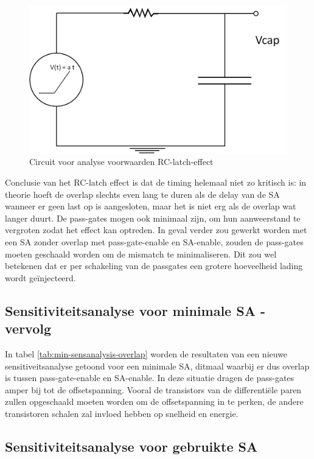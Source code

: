 \begin{figure}
  \centering
  \includegraphics[scale=0.4]{../fig/hfdstk-sensamp-RC-latch-maplecircuit.png}
  \caption{Circuit voor analyse voorwaarden RC-latch-effect}
  \label{fig:RC-latch-maplecircuit}
\end{figure}

Conclusie van het RC-latch effect is dat de timing helemaal niet zo kritisch is: in theorie hoeft de overlap slechts even lang te duren als de delay van de SA wanneer er geen last op is aangesloten, maar het is niet erg als de overlap wat langer duurt.
De pass-gates mogen ook minimaal zijn, om hun aanweerstand te vergroten zodat het effect kan optreden.
In geval verder zou gewerkt worden met een SA zonder overlap met pass-gate-enable en SA-enable, zouden de pass-gates moeten geschaald worden om de mismatch te minimaliseren. Dit zou wel betekenen dat er per schakeling van de passgates een grotere hoeveelheid lading wordt geïnjecteerd.


\subsection{Sensitiviteitsanalyse voor minimale SA - vervolg}

In tabel \ref{tab:min-sensanalysis-overlap} worden de resultaten van een nieuwe sensitiveitsanalyse getoond voor een minimale SA, ditmaal waarbij er dus overlap is tussen pass-gate-enable en SA-enable. In deze situatie dragen de pass-gates amper bij tot de offsetspanning. 
Vooral de transistors van de differentiële paren zullen opgeschaald moeten worden om de offsetspanning in te perken, de andere transistoren schalen zal invloed hebben op snelheid en energie.

\subsection{Sensitiviteitsanalyse voor gebruikte SA}


